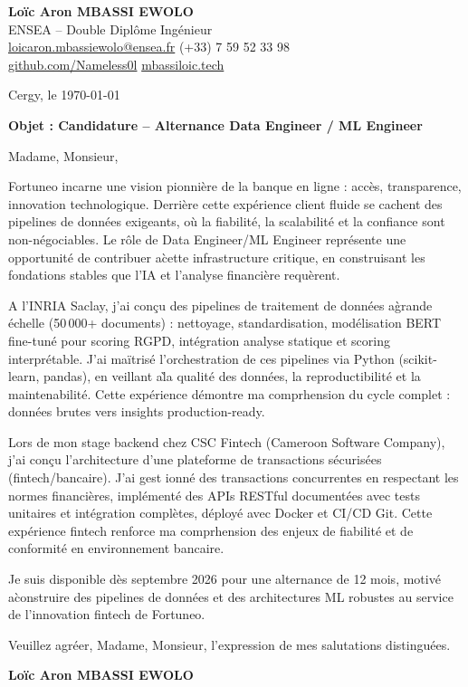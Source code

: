 \documentclass[a4paper,11pt]{article}
\begin{document}
\noindent
\textbf{Lo\"ic Aron MBASSI EWOLO} \\
ENSEA -- Double Dipl\^ome Ing\'enieur \\
\href{mailto:loicaron.mbassiewolo@ensea.fr}{loicaron.mbassiewolo@ensea.fr} \quad (+33) 7 59 52 33 98 \\
\href{https://github.com/Nameless0l}{github.com/Nameless0l} \quad \href{https://mbassiloic.tech}{mbassiloic.tech}

\vspace{1em}
\noindent Cergy, le \today

\vspace{1em}
\noindent \textbf{Objet : Candidature -- Alternance Data Engineer / ML Engineer}

\vspace{1.5em}
\noindent Madame, Monsieur,

\vspace{0.8em}
\noindent Fortuneo incarne une vision pionnière de la banque en ligne : acc\`es, transparence, innovation technologique. Derrière cette exp\'erience client fluide se cachent des pipelines de donn\'ees exigeants, o\`u la fiabilit\'e, la scalabilit\'e et la confiance sont non-n\'egociables. Le r\^ole de Data Engineer/ML Engineer repr\'esente une opportunit\'e de contribuer a\` cette infrastructure critique, en construisant les fondations stables que l'IA et l'analyse financi\`ere requ\`erent.

\vspace{0.8em}
\noindent A l'INRIA Saclay, j'ai con\c{c}u des pipelines de traitement de donn\'ees a\` grande \'echelle (50\,000+ documents) : nettoyage, standardisation, mod\'elisation BERT fine-tun\'e pour scoring RGPD, int\'egration analyse statique et scoring interpr\'etable. J'ai ma\"itris\'e l'orchestration de ces pipelines via Python (scikit-learn, pandas), en veillant a\` la qualit\'e des donn\'ees, la reproductibilit\'e et la maintenabilit\'e. Cette exp\'erience d\'emontre ma comprhension du cycle complet : donn\'ees brutes vers insights production-ready.

\vspace{0.8em}
\noindent Lors de mon stage backend chez CSC Fintech (Cameroon Software Company), j'ai con\c{c}u l'architecture d'une plateforme de transactions s\'ecuris\'ees (fintech/bancaire). J'ai gest ionn\'e des transactions concurrentes en respectant les normes financi\`eres, impl\'ement\'e des APIs RESTful document\'ees avec tests unitaires et int\'egration compl\`etes, d\'eploy\'e avec Docker et CI/CD Git. Cette exp\'erience fintech renforce ma comprhension des enjeux de fiabilit\'e et de conformit\'e en environnement bancaire.

\vspace{0.8em}
\noindent Je suis disponible d\`es septembre 2026 pour une alternance de 12 mois, motiv\'e a\` construire des pipelines de donn\'ees et des architectures ML robustes au service de l'innovation fintech de Fortuneo.

\vspace{1.5em}
\noindent Veuillez agr\'eer, Madame, Monsieur, l'expression de mes salutations distingu\'ees.

\vspace{2em}
\noindent \textbf{Lo\"ic Aron MBASSI EWOLO}
\end{document}
